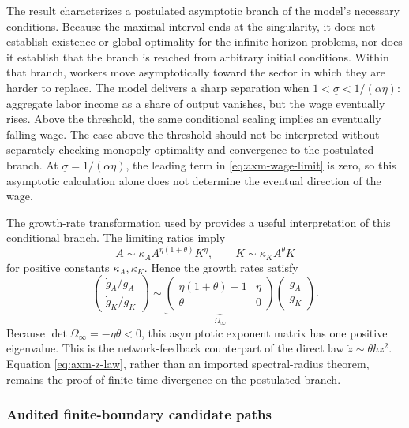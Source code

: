The result characterizes a postulated asymptotic branch of the model's necessary
conditions. Because the maximal interval ends at the singularity, it does not
establish existence or global optimality for the infinite-horizon problems, nor
does it establish that the branch is reached from arbitrary initial conditions.
Within that branch, workers move asymptotically toward the sector in which they
are harder to replace. The model delivers a sharp separation when
\(1<\underline\sigma<1/(\alpha\eta)\): aggregate labor income as a share of output
vanishes, but the wage eventually rises. Above the threshold, the same conditional
scaling implies an eventually falling wage. The case above the threshold should
not be interpreted without separately
checking monopoly optimality and convergence to the postulated branch.
At \(\underline\sigma=1/(\alpha\eta)\), the leading term in
\eqref{eq:axm-wage-limit} is zero, so this asymptotic calculation alone does not
determine the eventual direction of the wage.

The growth-rate transformation used by \citet{davidsonetal2026} provides a useful
interpretation of this conditional branch. The limiting ratios imply
\[
 \dot A\sim \kappa_A A^{\eta(1+\theta)}K^\eta,
 \qquad
 \dot K\sim \kappa_K A^\theta K
\]
for positive constants \(\kappa_A,\kappa_K\). Hence the growth rates satisfy
\begin{equation}
 \begin{pmatrix}
  \dot g_A/g_A\\[2pt] \dot g_K/g_K
 \end{pmatrix}
 \sim
 \underbrace{\begin{pmatrix}
  \eta(1+\theta)-1&\eta\\
  \theta&0
 \end{pmatrix}}_{\Omega_\infty}
 \begin{pmatrix}g_A\\g_K\end{pmatrix}.
 \label{eq:axm-singular-feedback-matrix}
\end{equation}
Because \(\det\Omega_\infty=-\eta\theta<0\), this asymptotic exponent matrix has
one positive eigenvalue. This is the network-feedback counterpart of the direct
law \(\dot z\sim\theta h z^2\). Equation \eqref{eq:axm-z-law}, rather than an
imported spectral-radius theorem, remains the proof of finite-time divergence on
the postulated branch.

\subsubsection{Audited finite-boundary candidate paths}

